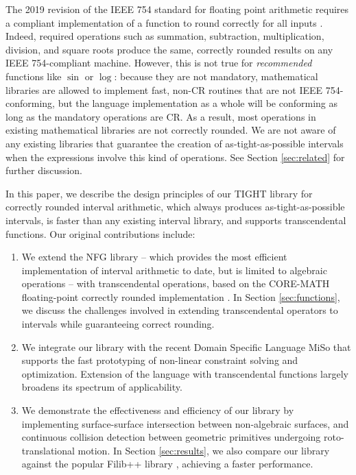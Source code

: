 The 2019 revision of the IEEE 754 standard for floating point arithmetic requires a compliant implementation of a function to round correctly for all inputs \cite{ieee754}. Indeed, required operations such as summation, subtraction, multiplication, division, and square roots produce the same, correctly rounded results on any IEEE 754-compliant machine.
However, this is not true for \emph{recommended} functions like $\sin$ or $\log$: because they are not mandatory, mathematical libraries are allowed to implement fast, non-CR routines that are not IEEE 754-conforming, but the language implementation as a whole will be conforming as long as the mandatory operations are CR.
As a result, most operations in existing mathematical libraries are not correctly rounded.
We are not aware of any existing libraries that guarantee the creation of as-tight-as-possible intervals when the expressions involve this kind of operations.
See Section \ref{sec:related} for further discussion.

In this paper, we describe the design principles of our TIGHT library for correctly rounded interval arithmetic, which always produces as-tight-as-possible intervals, is faster than any existing interval library, and supports transcendental functions.
%
Our original contributions include:
\begin{enumerate}
\item We extend the NFG library \cite{nfg} -- which provides the most efficient implementation of interval arithmetic to date, but is limited to algebraic operations -- with transcendental operations, based on the CORE-MATH floating-point correctly rounded implementation \cite{Sibidanov2022}.
In Section \ref{sec:functions}, we discuss the challenges involved in extending transcendental operators to intervals while guaranteeing correct rounding. 
\item We integrate our library with the recent Domain Specific Language MiSo \cite{Sichetti2025} that supports the fast prototyping of non-linear constraint solving and optimization. 
Extension of the language with transcendental functions largely broadens its spectrum of applicability. 
\item We demonstrate the effectiveness and efficiency of our library by implementing surface-surface intersection between non-algebraic surfaces, and continuous collision detection between geometric primitives undergoing roto-translational motion.  
In Section \ref{sec:results}, we also compare our library against the popular Filib++ library \cite{filib,filibpp}, achieving a faster performance.
\end{enumerate}

